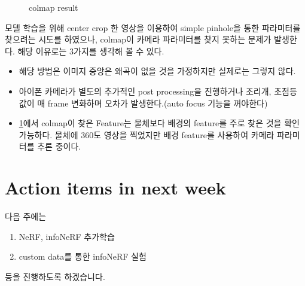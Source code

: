 \documentclass{vipweekly}
\begin{document}
\begin{figure}[h]
    \centering
    \hfill
    \hfill
    \caption{colmap result}
    \label{fig:colmap_error}
\end{figure}

모델 학습을 위해 center crop 한 영상을 이용하여 simple pinhole을 통한 파라미터를 찾으려는 시도를 하였으나, 
colmap이 카메라 파라미터를 찾지 못하는 문제가 발생한다. 해당 이유로는 3가지를 생각해 볼 수 있다.


\begin{itemize}
    \item 해당 방법은 이미지 중앙은 왜곡이 없을 것을 가정하지만 실제로는 그렇지 않다.
    \item 아이폰 카메라가 별도의 추가적인 post processing을 진행하거나 조리개, 초점등 값이 매 frame 변화하며 오차가 발생한다.(auto focus 기능을 꺼야한다)
    \item \ref{fig:colmap_error}에서 colmap이 찾은 Feature는 물체보다 배경의 feature를 주로 찾은 것을 확인 가능하다. 물체에 360도 영상을 찍었지만 배경 feature를 사용하여 카메라 파라미터를 추론 중이다.
\end{itemize}


\section*{Action items in next week}	%
다음 주에는 
\begin{enumerate}
    \item NeRF, infoNeRF 추가학습
    \item custom data를 통한 infoNeRF 실험 
\end{enumerate}
등을 진행하도록 하겠습니다.


 
 
\end{document}
